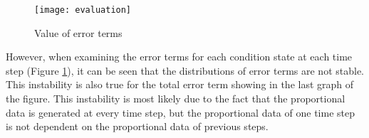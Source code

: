 \documentclass[Journal]{ascelike}
\begin{document}
\begin{figure}[h!]
\centering \texttt{[image: evaluation]} \caption{Value of error terms}


\label{evaluation} 
\end{figure}


However, when examining the error terms for each condition state at
each time step (Figure \ref{evaluation}), it can be seen that the
distributions of error terms are not stable. This instability is also
true for the total error term showing in the last graph of the figure.
This instability is most likely due to the fact that the proportional
data is generated at every time step, but the proportional data of
one time step is not dependent on the proportional data of previous
steps. 

\end{document}

